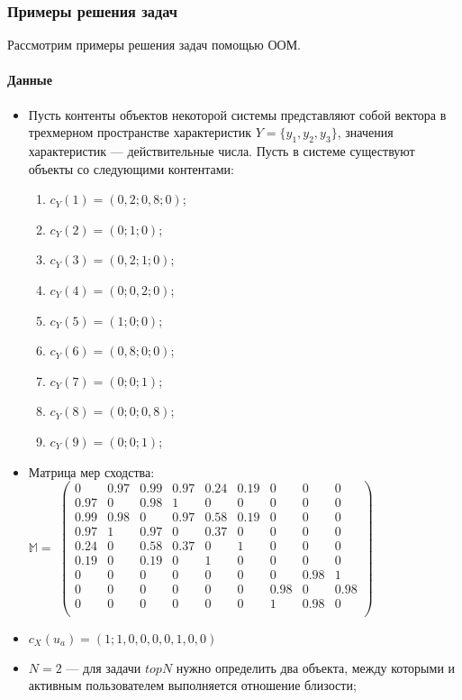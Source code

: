 
\subsubsection{Примеры решения задач}
Рассмотрим примеры решения задач помощью ООМ.
\paragraph{Данные}
\begin{itemize}
\item
	Пусть контенты объектов некоторой системы представляют
		собой вектора в трехмерном пространстве характеристик $Y =
		\{y_1,y_2,y_3\}$, значения характеристик
	--- действительные числа.
	Пусть в системе существуют объекты со следующими контентами:
  \begin{enumerate}
  \item $c_Y(1) = (0,2; 0,8; 0)$;
  \item $c_Y(2) = (0; 1; 0)$;
  \item $c_Y(3) = (0,2; 1; 0)$;
  \item $c_Y(4) = (0; 0,2; 0)$;
  \item $c_Y(5) = (1; 0; 0)$;
  \item $c_Y(6) = (0,8; 0; 0)$;
  \item $c_Y(7) = (0; 0; 1)$;
  \item $c_Y(8) = (0; 0; 0,8)$;
  \item $c_Y(9) = (0; 0; 1)$;
  \end{enumerate}
\item Матрица мер сходства:\\
$\mathbb{M} = $
$
\begin{pmatrix}
0    & 0.97 & 0.99   & 0.97 & 0.24 & 0.19 & 0 & 0    & 0    \\
0.97 & 0    & 0.98   & 1    &   0  &  0   & 0 & 0    & 0    \\
0.99 & 0.98 & 0      & 0.97 & 0.58 & 0.19 & 0 & 0    & 0    \\
0.97 & 1    & 0.97   & 0    & 0.37 & 0    & 0 & 0    & 0    \\
0.24 & 0    & 0.58   & 0.37 & 0    & 1    & 0 & 0    & 0    \\
0.19 & 0    & 0.19   & 0    & 1    & 0    & 0 & 0    & 0    \\
0    & 0    & 0      & 0    & 0    & 0    & 0 & 0.98 & 1    \\
0    & 0    & 0      & 0    & 0    & 0    & 0.98 & 0 & 0.98    \\
0    & 0    & 0      & 0    & 0    & 0    & 1    & 0.98 & 0    \\
\end{pmatrix}
$
\item $c_X(u_a) = (1;1,0,0,0,0,1,0,0)$
\item $N = 2$ --- для задачи $topN$ нужно определить
	два объекта, между которыми и активным пользователем выполняется отношение
		близости;
\end{itemize}

